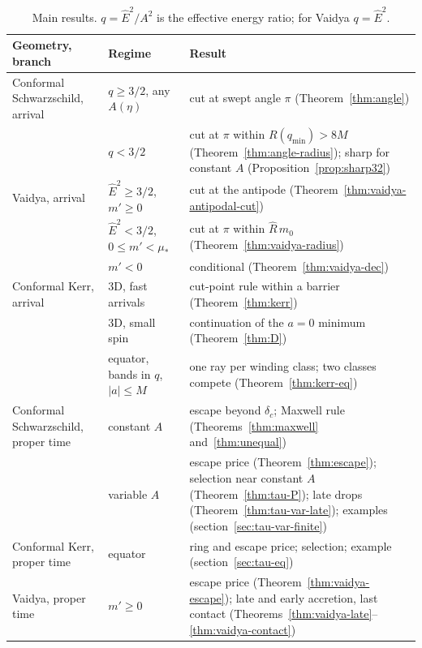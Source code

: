 \documentclass[aip,jmp,amsmath,amssymb,reprint]{revtex4-2}
\newcommand{\Ehat}{\hat E}
\theoremstyle{plain}
\theoremstyle{definition}
\begin{document}
\begin{table}
\caption{\label{tab:results}Main results. $q=\Ehat^2/A^2$ is the effective energy ratio; for Vaidya
$q=\Ehat^2$.}
\footnotesize
\begin{tabular}{@{}>{\raggedright\arraybackslash}p{}>{\raggedright\arraybackslash}p{}>{\raggedright\arraybackslash}p{}}
\hline\hline
Geometry, branch & Regime & Result\\
\hline
Conformal Schwarzschild, arrival & $q\ge3/2$, any $A(\eta)$ & cut at swept angle $\pi$ (Theorem~\ref{thm:angle})\\
 & $q<3/2$ & cut at $\pi$ within $R(q_{\min})>8M$ (Theorem~\ref{thm:angle-radius}); sharp for constant $A$
 (Proposition~\ref{prop:sharp32})\\
Vaidya, arrival & $\Ehat^2\ge3/2$, $m'\ge0$ & cut at the antipode (Theorem~\ref{thm:vaidya-antipodal-cut})\\
 & $\Ehat^2<3/2$, $0\le m'<\mu_*$ & cut at $\pi$ within $\widehat R\,m_0$ (Theorem~\ref{thm:vaidya-radius})\\
 & $m'<0$ & conditional (Theorem~\ref{thm:vaidya-dec})\\
Conformal Kerr, arrival & 3D, fast arrivals & cut-point rule within a barrier (Theorem~\ref{thm:kerr})\\
 & 3D, small spin & continuation of the $a=0$ minimum (Theorem~\ref{thm:D})\\
 & equator, bands in $q$, $|a|\le M$ & one ray per winding class; two classes compete (Theorem~\ref{thm:kerr-eq})\\
Conformal Schwarzschild, proper time & constant $A$ & escape beyond $\delta_c$; Maxwell rule (Theorems~\ref{thm:maxwell}
 and~\ref{thm:unequal})\\
 & variable $A$ & escape price (Theorem~\ref{thm:escape}); selection near constant $A$ (Theorem~\ref{thm:tau-P}); late
 drops (Theorem~\ref{thm:tau-var-late}); examples (section~\ref{sec:tau-var-finite})\\
Conformal Kerr, proper time & equator & ring and escape price; selection; example (section~\ref{sec:tau-eq})\\
Vaidya, proper time & $m'\ge0$ & escape price (Theorem~\ref{thm:vaidya-escape}); late and early accretion, last contact
 (Theorems~\ref{thm:vaidya-late}--\ref{thm:vaidya-contact})\\
\hline\hline
\end{tabular}
\end{table}
\end{document}
